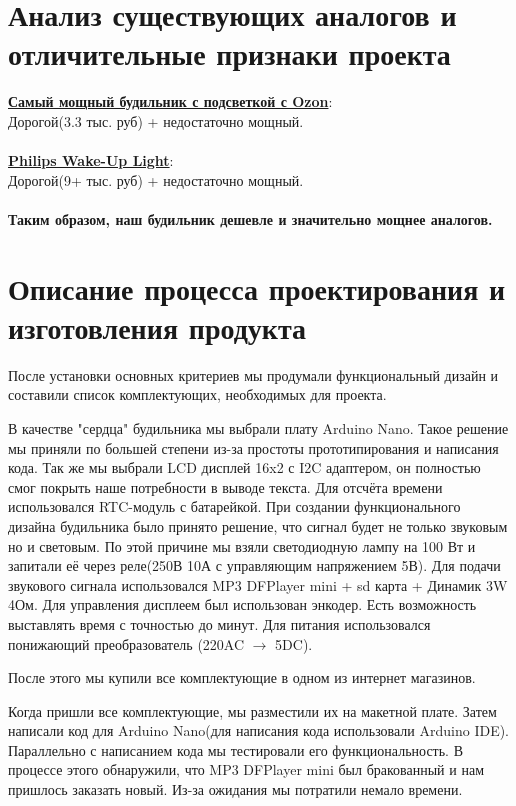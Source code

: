\documentclass[12pt,a4paper]{article}
\begin{document}
\section{Анализ существующих аналогов и отличительные признаки проекта}

\href{https://www.ozon.ru/product/nochnik-umnyy-budilnik-imitiruet-voshod-solntsa-elektronnyy-budilnik-s-reguliruemoy-sensornoy-1627021430/}{\textbf{Самый мощный будильник с подсветкой с Ozon}}: \\
Дорогой(3.3 тыс. руб) + недостаточно мощный.
\\
\\
\href{https://www.philips.ru/c-m-hs/light-therapy}{\textbf{Philips Wake-Up Light}}: \\
Дорогой(9+ тыс. руб) + недостаточно мощный.
\\ \\
\textbf{Таким образом, наш будильник дешевле и значительно мощнее аналогов.}

\section{Описание процесса проектирования и изготовления продукта}

После установки основных критериев мы продумали функциональный дизайн и составили список комплектующих, необходимых для проекта. 

В качестве "сердца" будильника мы выбрали плату Arduino Nano. Такое решение мы приняли по большей степени из-за простоты прототипирования и написания кода. Так же мы выбрали LCD дисплей 16x2 с I2C адаптером, он полностью смог покрыть наше потребности в выводе текста. Для отсчёта времени использовался RTC-модуль с батарейкой. При создании функционального дизайна будильника было принято решение, что сигнал будет не только звуковым но и световым. По этой причине мы взяли светодиодную лампу на 100 Вт и запитали её через реле(250В 10А с управляющим напряжением 5В). Для подачи звукового сигнала использовался MP3 DFPlayer mini + sd карта + Динамик 3W 4Ом. Для управления дисплеем был использован энкодер. Есть возможность выставлять время с точностью до минут. Для питания использовался понижающий преобразователь (220AC $\rightarrow$ 5DC).

После этого мы купили все комплектующие в одном из интернет магазинов.

Когда пришли все комплектующие, мы разместили их на макетной плате.
Затем написали код для Arduino Nano(для написания кода использовали Arduino IDE). Параллельно с написанием кода мы тестировали его функциональность. В процессе этого обнаружили, что MP3 DFPlayer mini был бракованный и нам пришлось заказать новый. Из-за ожидания мы потратили немало времени.
\end{document}
